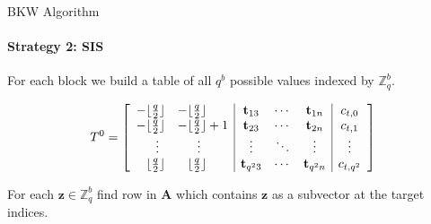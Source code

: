 \documentclass[10pt,compress]{beamer}
\renewcommand{\vec}[1]{\mathbf{#1}\xspace}
\renewcommand{\vec}[1]{\mathbf{#1}\xspace}
\newcommand{\Z}{\ensuremath{\mathbb{Z}}\xspace}
\begin{document}
\begin{frame}[fragile]{BKW Algorithm}
  \framesubtitle{Strategy 2: SIS}
  For each block we build a table of all $q^b$ possible values indexed by $\Z_q^b$.

  \begin{equation*}
    T^0 = \left[ 
      \begin{array}{ll|ccc|c}
        -\lfloor\frac{q}{2}\rfloor & -\lfloor\frac{q}{2}\rfloor & \bold{t}_{13} & \cdots & \bold{t}_{1n} & c_{t,0}\\
        -\lfloor\frac{q}{2}\rfloor & -\lfloor\frac{q}{2}\rfloor+1 & \bold{t}_{23} & \cdots & \bold{t}_{2n} & c_{t,1}\\
        \phantom{--}\vdots & \phantom{--}\vdots & \vdots & \ddots & \vdots & \vdots\\
        \phantom{-}\lfloor\frac{q}{2}\rfloor & \phantom{-}\lfloor\frac{q}{2}\rfloor& \bold{t}_{q^23} & \cdots & \bold{t}_{q^2n} & c_{t,q^2}
      \end{array}\right]
  \end{equation*}

  For each $\vec{z} \in \Z_q^b$ find row in $\vec{A}$ which contains $\vec{z}$ as a subvector at the target indices.
\end{frame}
\end{document}

